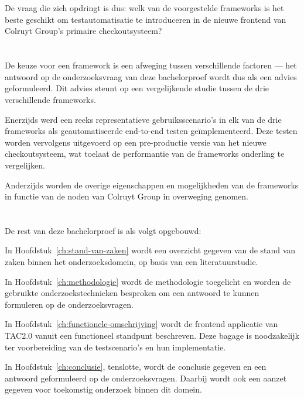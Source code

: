 \section{}
\label{sec:onderzoeksvraag}

De vraag die zich opdringt is dus: welk van de voorgestelde frameworks is het beste geschikt om testautomatisatie te introduceren in de nieuwe frontend van Colruyt Group's primaire checkoutsysteem?

\section{}
\label{sec:onderzoeksdoelstelling}

De keuze voor een framework is een afweging tussen verschillende factoren — het antwoord op de onderzoeksvraag van deze bachelorproef wordt dus als een advies geformuleerd. Dit advies steunt op een vergelijkende studie tussen de drie verschillende frameworks.

Enerzijds werd een reeks representatieve gebruiksscenario's in elk van de drie frameworks als geautomatiseerde end-to-end testen geïmplementeerd. Deze testen worden vervolgens uitgevoerd op een pre-productie versie van het nieuwe checkoutsysteem, wat toelaat de performantie van de frameworks onderling te vergelijken.

Anderzijds worden de overige eigenschappen en mogelijkheden van de frameworks in functie van de noden van Colruyt Group in overweging genomen.

\section{}
\label{sec:opzet-bachelorproef}


De rest van deze bachelorproef is als volgt opgebouwd:

In Hoofdstuk~\ref{ch:stand-van-zaken} wordt een overzicht gegeven van de stand van zaken binnen het onderzoeksdomein, op basis van een literatuurstudie.

In Hoofdstuk~\ref{ch:methodologie} wordt de methodologie toegelicht en worden de gebruikte onderzoekstechnieken besproken om een antwoord te kunnen formuleren op de onderzoeksvragen.

In Hoofdstuk~\ref{ch:functionele-omschrijving} wordt de frontend applicatie van TAC2.0 vanuit een functioneel standpunt beschreven. Deze bagage is noodzakelijk ter voorbereiding van de testscenario's en hun implementatie.


In Hoofdstuk~\ref{ch:conclusie}, tenslotte, wordt de conclusie gegeven en een antwoord geformuleerd op de onderzoeksvragen. Daarbij wordt ook een aanzet gegeven voor toekomstig onderzoek binnen dit domein.
